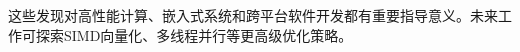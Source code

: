\documentclass[a4paper,colorlinks=true,linkcolor=blue,urlcolor=blue,citecolor=green,bookmarks=true]{article}
\begin{document}
这些发现对高性能计算、嵌入式系统和跨平台软件开发都有重要指导意义。未来工作可探索SIMD向量化、多线程并行等更高级优化策略。

\clearpage
\def\bibsection{
  \section*{\refname\markboth{\refname}{\refname}}%
  \addcontentsline{toc}{section}{\refname}%
  \begingroup
    \fontsize{12}{14}\selectfont%
    \vspace{0.8em}
  \endgroup
}

\nocite{*}


\end{document}
